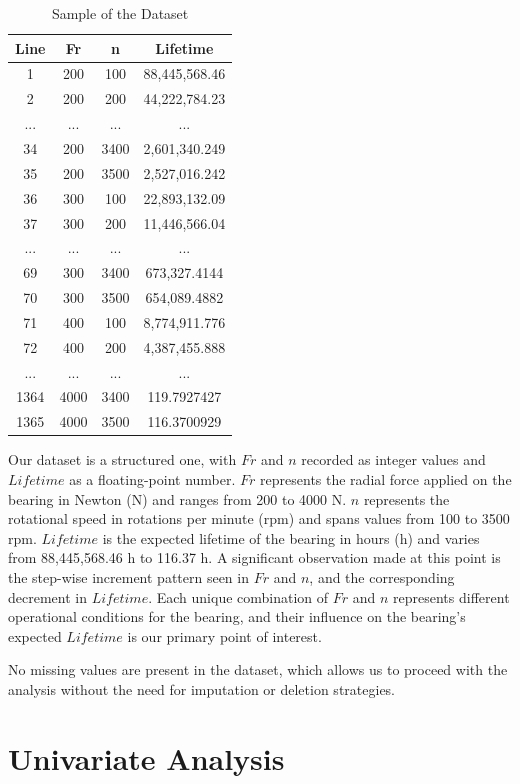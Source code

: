 \begin{table}[ht]
  \centering
  \caption{Sample of the Dataset}
  \label{table:bearings-dataset}
  \begin{tabular}{|c|c|c|c|}
  \hline
  Line & Fr & n & Lifetime \\
  \hline
  1 & 200 & 100 & 88,445,568.46 \\
  2 & 200 & 200 & 44,222,784.23 \\
  ... & ... & ... & ... \\
  34 & 200 & 3400 & 2,601,340.249 \\
  35 & 200 & 3500 & 2,527,016.242 \\
  36 & 300 & 100 & 22,893,132.09 \\
  37 & 300 & 200 & 11,446,566.04 \\
  ... & ... & ... & ... \\
  69 & 300 & 3400 & 673,327.4144 \\
  70 & 300 & 3500 & 654,089.4882 \\
  71 & 400 & 100 & 8,774,911.776 \\
  72 & 400 & 200 & 4,387,455.888 \\
  ... & ... & ... & ... \\
  1364 & 4000 & 3400 & 119.7927427 \\
  1365 & 4000 & 3500 & 116.3700929 \\
  \hline
  \end{tabular}
\end{table}

Our dataset is a structured one, with $Fr$ and $n$ recorded as integer values and $Lifetime$ as a floating-point number. $Fr$ represents the radial force applied on the bearing in Newton (N) and ranges from 200 to 4000 N. $n$ represents the rotational speed in rotations per minute (rpm) and spans values from 100 to 3500 rpm. $Lifetime$ is the expected lifetime of the bearing in hours (h) and varies from 88,445,568.46 h to 116.37 h. A significant observation made at this point is the step-wise increment pattern seen in $Fr$ and $n$, and the corresponding decrement in $Lifetime$. Each unique combination of $Fr$ and $n$ represents different operational conditions for the bearing, and their influence on the bearing's expected $Lifetime$ is our primary point of interest.

No missing values are present in the dataset, which allows us to proceed with the analysis without the need for imputation or deletion strategies.


\section{Univariate Analysis}

